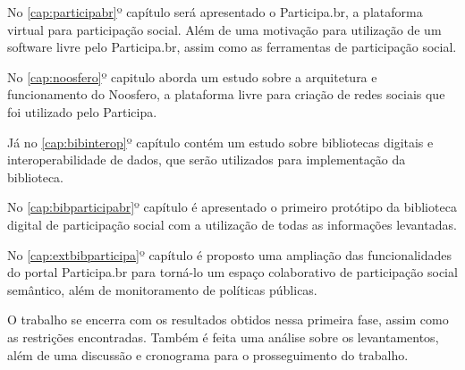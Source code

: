 No \ref{cap:participabr}º capítulo será apresentado o Participa.br, a plataforma virtual para participação social. Além de uma motivação para utilização de um software livre pelo Participa.br, assim como as ferramentas de participação social.

No \ref{cap:noosfero}º capitulo aborda um estudo sobre a arquitetura e funcionamento do Noosfero, a plataforma livre para criação de redes sociais que foi utilizado pelo Participa.

Já no \ref{cap:bibinterop}º capítulo contém um estudo sobre bibliotecas digitais e interoperabilidade de dados, que serão utilizados para implementação da biblioteca.

No \ref{cap:bibparticipabr}º capítulo é apresentado o primeiro protótipo da biblioteca digital de participação social com a utilização de todas as informações levantadas.

No \ref{cap:extbibparticipa}º capítulo é proposto uma ampliação das funcionalidades do portal Participa.br para torná-lo um espaço colaborativo de participação social semântico, além de monitoramento de políticas públicas.

O trabalho se encerra com os resultados obtidos nessa primeira fase, assim como as restrições encontradas. Também é feita uma análise sobre os levantamentos, além de uma discussão e cronograma para o prosseguimento do trabalho.